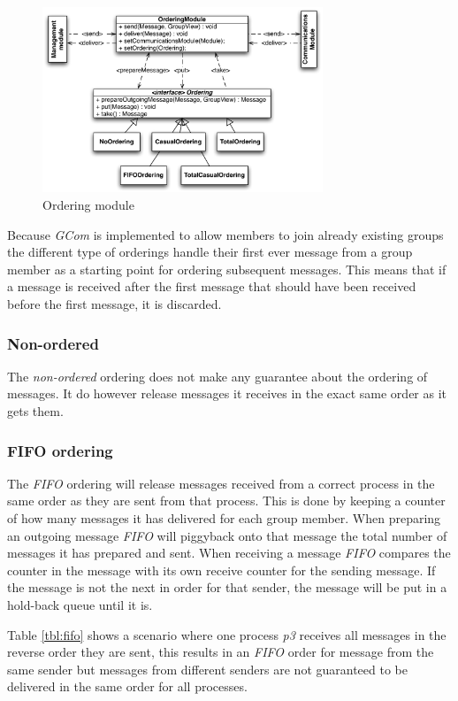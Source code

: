 \documentclass[titlepage, twocolumn, a4paper, 10pt]{article}
\begin{document}
\begin{figure}[!thb]
  \centering
  \includegraphics[width=3.3in]{images/Ordering.pdf}
  \caption{Ordering module}
  \label{fig:images/ordering}
\end{figure}

Because \textit{GCom} is implemented to allow members to join already
existing groups the different type of orderings handle their first
ever message from a group member as a starting point for ordering
subsequent messages. This means that if a message is received after
the first message that should have been received before the first
message, it is discarded.

\subsubsection{Non-ordered}\label{sec:-non-ordered}
The \textit{non-ordered} ordering does not make any guarantee about
the ordering of messages. It do however release messages it receives
in the exact same order as it gets them.

\subsubsection{FIFO ordering}\label{sec:fifo}
The \textit{FIFO} ordering will release messages received from a
correct process in the same order as they are sent from that process.
This is done by keeping a counter of how many messages it has
delivered for each group member. When preparing an outgoing message
\textit{FIFO} will piggyback onto that message the total number of
messages it has prepared and sent. When receiving a message
\textit{FIFO} compares the counter in the message with its own receive
counter for the sending message. If the message is not the next in
order for that sender, the message will be put in a hold-back queue
until it is.

Table \ref{tbl:fifo} shows a scenario where one process \textit{p3}
receives all messages in the reverse order they are sent, this results
in an \textit{FIFO} order for message from the same sender but
messages from different senders are not guaranteed to be delivered in
the same order for all processes.
\end{document}
